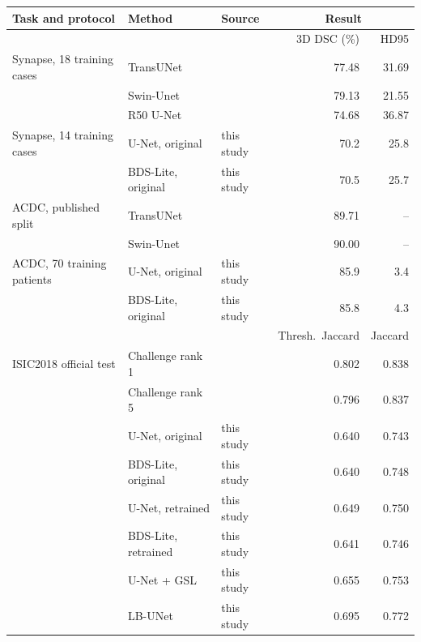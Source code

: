 \begin{tabular}{lllrr}
\toprule
Task and protocol & Method & Source & \multicolumn{2}{c}{Result} \\
\midrule
 & & & 3D DSC (\%) & HD95 \\
Synapse, 18 training cases & TransUNet & \citet{Chen2021TransUNetArxiv} & 77.48 & 31.69 \\
 & Swin-Unet & \citet{Cao2022SwinUnet} & 79.13 & 21.55 \\
 & R50 U-Net & \citet{Chen2021TransUNetArxiv} & 74.68 & 36.87 \\
Synapse, 14 training cases & U-Net, original & this study & 70.2 & 25.8 \\
 & BDS-Lite, original & this study & 70.5 & 25.7 \\
\midrule
ACDC, published split & TransUNet & \citet{Chen2021TransUNetArxiv} & 89.71 & -- \\
 & Swin-Unet & \citet{Cao2022SwinUnet} & 90.00 & -- \\
ACDC, 70 training patients & U-Net, original & this study & 85.9 & 3.4 \\
 & BDS-Lite, original & this study & 85.8 & 4.3 \\
\midrule
 & & & Thresh.\ Jaccard & Jaccard \\
ISIC2018 official test & Challenge rank 1 & \citet{Codella2019Skin} & 0.802 & 0.838 \\
 & Challenge rank 5 & \citet{Codella2019Skin} & 0.796 & 0.837 \\
 & U-Net, original & this study & 0.640 & 0.743 \\
 & BDS-Lite, original & this study & 0.640 & 0.748 \\
 & U-Net, retrained & this study & 0.649 & 0.750 \\
 & BDS-Lite, retrained & this study & 0.641 & 0.746 \\
 & U-Net + GSL & this study & 0.655 & 0.753 \\
 & LB-UNet & this study & 0.695 & 0.772 \\
\bottomrule
\end{tabular}

